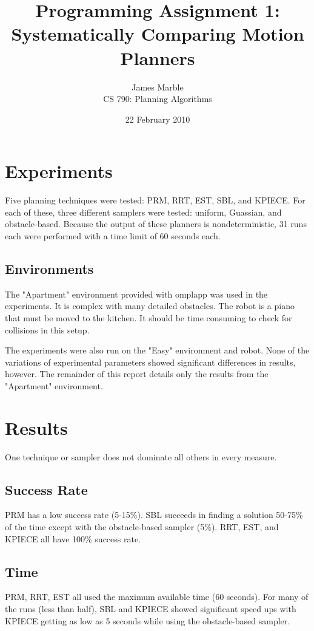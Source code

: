 \documentclass[twocolumn]{article}
\title{Programming Assignment 1:\\
       Systematically Comparing Motion Planners}
\author{James Marble \\   
        CS 790: Planning Algorithms}
\date{22 February 2010}
\begin{document}
\maketitle

\section{Experiments}

Five planning techniques were tested: PRM, RRT, EST, SBL, and KPIECE. For each of these, three different samplers were tested: uniform, Guassian, and obstacle-based. Because the output of these planners is nondeterministic, 31 runs each were performed with a time limit of 60 seconds each.

\subsection{Environments}

The "Apartment" environment provided with omplapp was used in the experiments.  It is complex with many detailed obstacles. The robot is a piano that must be moved to the kitchen. It should be time consuming to check for collisions in this setup.

The experiments were also run on the "Easy" environment and robot. None of the variations of experimental parameters showed significant differences in results, however. The remainder of this report details only the results from the "Apartment" environment.


\section{Results}

One technique or sampler does not dominate all others in every measure.

\subsection{Success Rate}

PRM has a low success rate (5-15\%). SBL succeeds in finding a solution 50-75\% of the time except with the obstacle-based sampler (5\%).  RRT, EST, and KPIECE all have 100\% success rate.


\subsection{Time}

PRM, RRT, EST all used the maximum available time (60 seconds). For many of the runs (less than half), SBL and KPIECE showed significant speed ups with KPIECE getting as low as 5 seconds while using the obstacle-based sampler.
\end{document}
